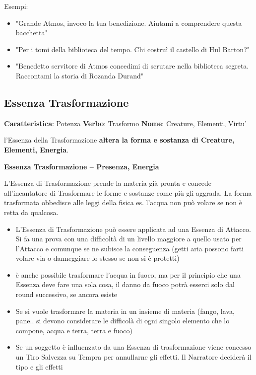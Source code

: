 \documentclass[a4paper,11pt,twoside,openany]{book}
\begin{document}
\bigskip

Esempi:
\begin{itemize}
	\item
	      "Grande Atmos, invoco la tua benedizione. Aiutami a comprendere questa bacchetta"
	\item
	      "Per i tomi della biblioteca del tempo. Chi costruì il castello di Hul Barton?"
	\item
	      "Benedetto servitore di Atmos concedimi di scrutare nella biblioteca segreta. Raccontami la storia di Rozanda Durand"
\end{itemize}
\pagebreak


\subsection{Essenza Trasformazione}

\textbf{Caratteristica}: Potenza
\textbf{Verbo}: Trasformo
\textbf{Nome}: Creature, Elementi, Virtu'

\label{essenza-trasformazione---potenza}

l'Essenza della Trasformazione \textbf{altera la forma e sostanza di Creature, Elementi, Energia}.

\bigskip

\textbf{Essenza Trasformazione -- Presenza, Energia}

L'Essenza di Trasformazione prende la materia già pronta e concede all'incantatore di Trasformare le forme e sostanze come più gli aggrada. La forma trasformata obbedisce alle leggi della fisica es. l'acqua non può volare se non è retta da qualcosa.

\begin{itemize}
	\item
	      L'Essenza di Trasformazione può essere applicata ad una Essenza di Attacco. Si fa una prova con una difficoltà di un livello maggiore a quello usato per l'Attacco e comunque se ne subisce la conseguenza (getti aria possono farti volare via o danneggiare lo stesso se non si è protetti)
	\item
	      è anche possibile trasformare l'acqua in fuoco, ma per il principio che una Essenza deve fare una sola cosa, il danno da fuoco potrà esserci solo dal round successivo, se ancora esiste
	\item
	      Se si vuole trasformare la materia in un insieme di materia (fango, lava, pane.. si devono considerare le difficolà di ogni singolo elemento che lo compone, acqua e terra, terra e fuoco)
	\item
	      Se un soggetto è influenzato da una Essenza di trasformazione viene concesso un Tiro Salvezza su Tempra per annullarne gli effetti. Il Narratore deciderà il tipo e gli effetti
\end{itemize}
\end{document}

